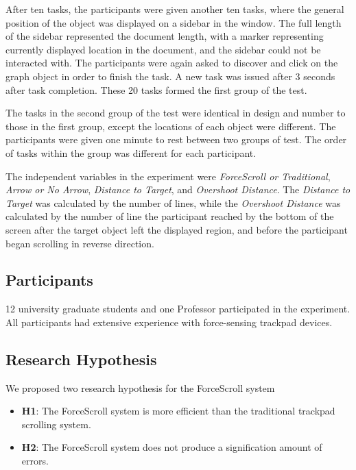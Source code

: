 \documentclass{sigchi}
\begin{document}
After ten tasks, the participants were given another ten tasks, where the general position of the object was displayed on a sidebar in the window. The full length of the sidebar represented the document length, with a marker representing currently displayed location in the document, and the sidebar could not be interacted with. The participants were again asked to discover and click on the graph object in order to finish the task. A new task was issued after 3 seconds after task completion. These 20 tasks formed the first group of the test. 

The tasks in the second group of the test were identical in design and number to those in the first group, except the locations of each object were different. The participants were given one minute to rest between two groups of test. The order of tasks within the group was different for each participant.

The independent variables in the experiment were \textit{ForceScroll or Traditional}, \textit{Arrow or No Arrow}, \textit{Distance to Target}, and \textit{Overshoot Distance}. The \textit{Distance to Target} was calculated by the number of lines, while the \textit{Overshoot Distance} was calculated by the number of line the participant reached by the bottom of the screen after the target object left the displayed region, and before the participant began scrolling in reverse direction.   

\subsection{Participants}
12 university graduate students and one Professor participated in the experiment. All participants had extensive experience with force-sensing trackpad devices. 
    
\subsection{Research Hypothesis}

We proposed two research hypothesis for the ForceScroll system

\begin{itemize}
	\item \textbf{H1}: The ForceScroll system is more efficient than the traditional trackpad scrolling system.
	\item \textbf{H2}: The ForceScroll system does not produce a signification amount of errors.
\end{itemize}
\end{document}
